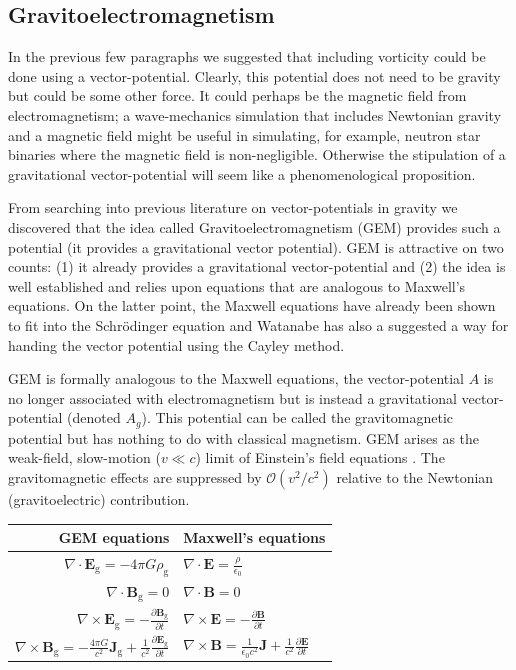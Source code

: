 \subsection{Gravitoelectromagnetism}
\label{GEM}
In the previous few paragraphs we suggested that including vorticity could be done using a vector-potential. Clearly, this potential does not need to be gravity but could be some other force. It could perhaps be the magnetic field from electromagnetism; a wave-mechanics simulation that includes Newtonian gravity and a magnetic field might be useful in simulating, for example, neutron star binaries where the magnetic field is non-negligible. Otherwise the stipulation of a gravitational vector-potential will seem like a phenomenological proposition.

From searching into previous literature on vector-potentials in gravity we discovered that the idea called Gravitoelectromagnetism (GEM)  \citep{bib_gravito} provides such a potential (it provides a gravitational vector potential). GEM is attractive on two counts: (1) it already provides a gravitational vector-potential and (2) the idea is well established and relies upon equations that are analogous to Maxwell's equations. On the latter point, the Maxwell equations have already been shown to fit into the Schr\"odinger equation and Watanabe \citep{bib_wat2} has also a suggested a way for handing the vector potential using the Cayley method.

GEM is formally analogous to the Maxwell equations, the vector-potential $A$ is no longer associated with electromagnetism but is instead a gravitational vector-potential (denoted $A_g$). This potential can be called the gravitomagnetic potential but has nothing to do with classical magnetism. GEM arises as the weak-field, slow-motion ($v \ll c$) limit of Einstein's field equations \citep{bib_gravito}. The gravitomagnetic effects are suppressed by $\mathcal{O}(v^2/c^2)$ relative to the Newtonian (gravitoelectric) contribution.

\vspace*{1cm}
\begin{center}
\begin{tabular}{|r|l|}
  \hline
  GEM equations & Maxwell's equations \\ \hline
$\nabla \cdot \mathbf{E}_\text{g} = -4 \pi G \rho_\text{g}$  & $\nabla \cdot \mathbf{E} =  \frac{\rho}{\epsilon_0}$ \\
$\nabla \cdot \mathbf{B}_\text{g} = 0$ & $\nabla \cdot \mathbf{B} = 0$ \\
$\nabla\times\mathbf{E}_\text{g}= -\frac{\partial\mathbf{B}_\text{g}}{\partial t}$& $\nabla\times\mathbf{E} = -\frac{\partial\mathbf{B}}{\partial t}$\\
$\nabla \times \mathbf{B}_\text{g} = -\frac{4 \pi G}{c^2} \mathbf{J}_\text{g} + \frac{1}{c^2} \frac{\partial \mathbf{E}_\text{g}} {\partial t}$ & $\nabla \times \mathbf{B} = \frac{1}{\epsilon_0 c^2} \mathbf{J} + \frac{1}{c^2} \frac{\partial \mathbf{E}} {\partial t}$ \\
  \hline
\end{tabular}
\end{center}
\vspace*{1cm}

